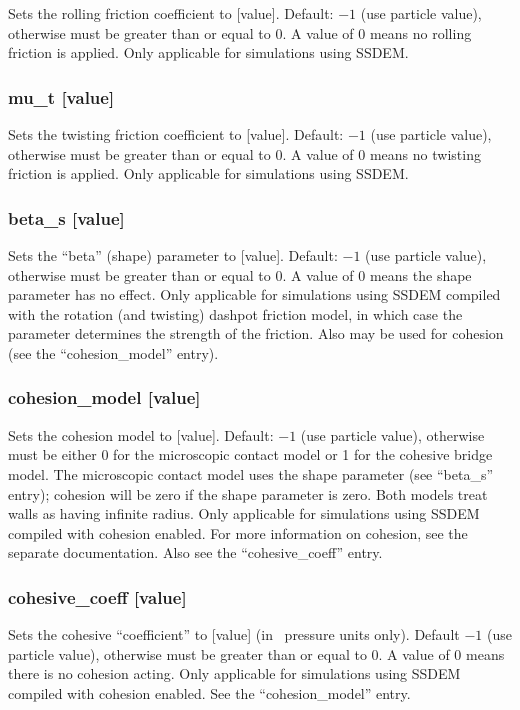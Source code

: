 Sets the rolling friction coefficient to [value].  Default: $-1$ (use
particle value), otherwise must be greater than or equal to 0.  A
value of 0 means no rolling friction is applied.  Only applicable for
simulations using SSDEM.

\subsubsection{mu\_t [value]}

Sets the twisting friction coefficient to [value].  Default: $-1$ (use
particle value), otherwise must be greater than or equal to 0.  A
value of 0 means no twisting friction is applied.  Only applicable for
simulations using SSDEM.

\subsubsection{beta\_s [value]}

Sets the ``beta'' (shape) parameter to [value].  Default: $-1$ (use
particle value), otherwise must be greater than or equal to 0.  A
value of 0 means the shape parameter has no effect.  Only applicable
for simulations using SSDEM compiled with the rotation (and twisting)
dashpot friction model, in which case the parameter determines the
strength of the friction.  Also may be used for cohesion (see the
``cohesion\_model'' entry).

\subsubsection{cohesion\_model [value]}

Sets the cohesion model to [value].  Default: $-1$ (use particle
value), otherwise must be either 0 for the microscopic contact model
or 1 for the cohesive bridge model.  The microscopic contact model
uses the shape parameter (see ``beta\_s'' entry); cohesion will be
zero if the shape parameter is zero.  Both models treat walls as
having infinite radius.  Only applicable for simulations using SSDEM
compiled with cohesion enabled.  For more information on cohesion, see
the separate documentation.  Also see the ``cohesive\_coeff''
entry.

\subsubsection{cohesive\_coeff [value]}

Sets the cohesive ``coefficient'' to [value] (in \pkd\ pressure units
only).  Default $-1$ (use particle value), otherwise must be greater
than or equal to 0.  A value of 0 means there is no cohesion acting.
Only applicable for simulations using SSDEM compiled with cohesion
enabled.  See the ``cohesion\_model'' entry.

